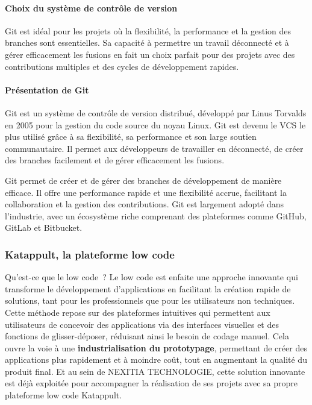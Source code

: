 \documentclass[12pt]{report}
\begin{document}
				\paragraph{Choix du système de contrôle de version}
				
				Git est idéal pour les projets où la flexibilité, la performance et la gestion des branches sont essentielles. Sa capacité à permettre un travail déconnecté et à gérer efficacement les fusions en fait un choix parfait pour des projets avec des contributions multiples et des cycles de développement rapides.

				\paragraph{Présentation de Git}

				Git est un système de contrôle de version distribué, développé par Linus Torvalds en 2005 pour la gestion du code source du noyau Linux. Git est devenu le VCS le plus utilisé grâce à sa flexibilité, sa performance et son large soutien communautaire. Il permet aux développeurs de travailler en déconnecté, de créer des branches facilement et de gérer efficacement les fusions.

				Git permet de créer et de gérer des branches de développement de manière efficace. Il offre une performance rapide et une flexibilité accrue, facilitant la collaboration et la gestion des contributions. Git est largement adopté dans l'industrie, avec un écosystème riche comprenant des plateformes comme GitHub, GitLab et Bitbucket\cite{Tsitoara}.

				


				\subsubsection{Katappult, la plateforme low code}

				\hspace{15pt} Qu'est-ce que le low code ? Le low code est enfaite une approche innovante qui transforme le développement d'applications en facilitant la création rapide de solutions, tant pour les professionnels que pour les utilisateurs non techniques. Cette méthode repose sur des plateformes intuitives qui permettent aux utilisateurs de concevoir des applications via des interfaces visuelles et des fonctions de glisser-déposer, réduisant ainsi le besoin de codage manuel. Cela ouvre la voie à une \textbf{industrialisation du prototypage}, permettant de créer des applications plus rapidement et à moindre coût, tout en augmentant la qualité du produit final. Et au sein de NEXITIA TECHNOLOGIE, cette solution innovante est déjà exploitée pour accompagner la réalisation de ses projets avec sa propre plateforme low code Katappult.
	
\end{document}
